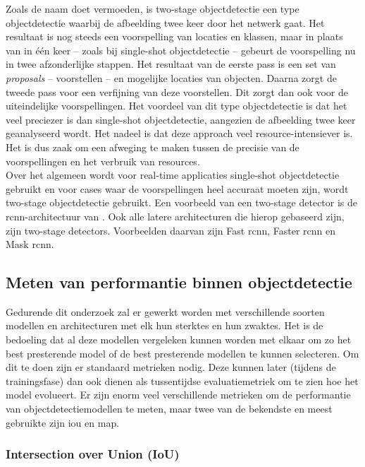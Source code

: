 Zoals de naam doet vermoeden, is two-stage objectdetectie een type objectdetectie waarbij de afbeelding twee keer door het netwerk gaat. Het resultaat is nog steeds een voorspelling van locaties en klassen, maar in plaats van in één keer -- zoals bij single-shot objectdetectie -- gebeurt de voorspelling nu in twee afzonderlijke stappen. Het resultaat van de eerste pass is een set van \emph{proposals} -- voorstellen -- en mogelijke locaties van objecten. Daarna zorgt de tweede pass voor een verfijning van deze voorstellen. Dit zorgt dan ook voor de uiteindelijke voorspellingen. Het voordeel van dit type objectdetectie is dat het veel preciezer is dan single-shot objectdetectie, aangezien de afbeelding twee keer geanalyseerd wordt. Het nadeel is dat deze approach veel resource-intensiever is. Het is dus zaak om een afweging te maken tussen de precisie van de voorspellingen en het verbruik van resources. \autocite{Carranza_Garcia_2020} \\

Over het algemeen wordt voor real-time applicaties single-shot objectdetectie gebruikt en voor cases waar de voorspellingen heel accuraat moeten zijn, wordt two-stage objectdetectie gebruikt. Een voorbeeld van een two-stage detector is de \gls{rcnn}-architectuur van \textcite{Girshick_2013}. Ook alle latere architecturen die hierop gebaseerd zijn, zijn two-stage detectors. Voorbeelden daarvan zijn Fast \gls{rcnn}, Faster \gls{rcnn} en Mask \gls{rcnn}. \autocite{Ren_2015}

\subsection{Meten van performantie binnen objectdetectie}

Gedurende dit onderzoek zal er gewerkt worden met verschillende soorten modellen en architecturen met elk hun sterktes en hun zwaktes. Het is de bedoeling dat al deze modellen vergeleken kunnen worden met elkaar om zo het best presterende model of de best presterende modellen te kunnen selecteren. Om dit te doen zijn er standaard metrieken nodig. Deze kunnen later (tijdens de trainingsfase) dan ook dienen als tussentijdse evaluatiemetriek om te zien hoe het model evolueert. Er zijn enorm veel verschillende metrieken om de performantie van objectdetectiemodellen te meten, maar twee van de bekendste en meest gebruikte zijn \gls{iou} en \gls{map}.

\subsubsection{Intersection over Union (IoU)}

